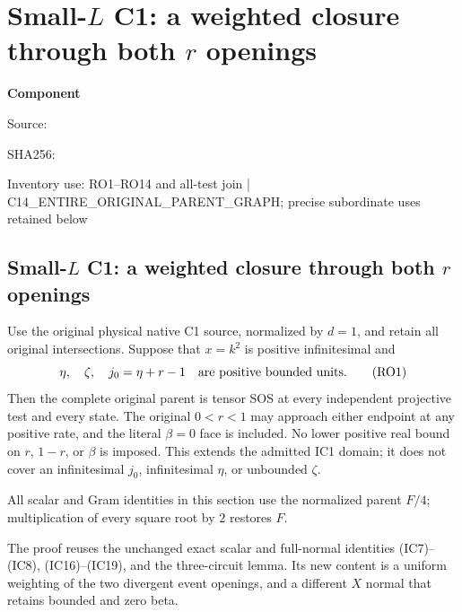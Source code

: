 \chapter{Small-$L$ C1: a weighted closure through both $r$ openings}
\label{component:p3df6e6bdd8f4}
\noindent\textbf{Component }\par
{\small\noindent Source: \par}
{\small\noindent SHA256: \par}
{\small\noindent Inventory use: RO1--RO14 and all-test join | C14\_\allowbreak{}ENTIRE\_\allowbreak{}ORIGINAL\_\allowbreak{}PARENT\_\allowbreak{}GRAPH; precise subordinate uses retained below\par}
\medskip
\section{Small-$L$ C1: a weighted closure through both $r$ openings}
\label{p3df6e6bdd8f4:sec:r13-c1-r-openings}

\begin{theorem}
Use the original physical native C1 source, normalized by $d=1$, and
retain all original intersections. Suppose that $x=k^2$ is positive
infinitesimal and
\[
 \eta,\quad\zeta,\quad j_0=\eta+r-1
       \quad\hbox{are positive bounded units}.                 \tag{RO1}
\]
Then the complete original parent is tensor SOS at every independent
projective test and every state. The original $0<r<1$ may approach
either endpoint at any positive rate, and the literal $\beta=0$ face
is included. No lower positive real bound on $r$, $1-r$, or $\beta$
is imposed. This extends the admitted IC1 domain; it does
not cover an infinitesimal $j_0$, infinitesimal $\eta$, or unbounded
$\zeta$.
\end{theorem}

All scalar and Gram identities in this section use the normalized
parent $F/4$; multiplication of every square root by $2$ restores $F$.

The proof reuses the unchanged exact scalar and full-normal identities
(IC7)--(IC8), (IC16)--(IC19), and the three-circuit lemma. Its new
content is a uniform weighting of the two divergent event openings,
and a different $X$ normal that retains bounded and zero beta.

